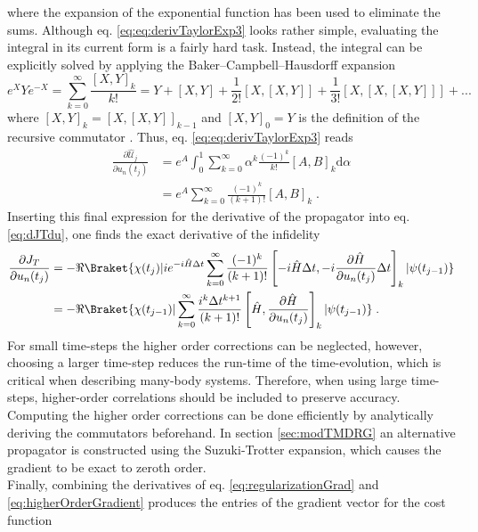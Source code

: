 where the expansion of the exponential function has been used to eliminate the sums. Although eq. \eqref{eq:eq:derivTaylorExp3} looks rather simple, evaluating the integral in its current form is a fairly hard task. Instead, the integral can be explicitly solved by applying the Baker–Campbell–Hausdorff expansion 
\begin{equation}
	e^X Y e^{-X} = \sum_{k = 0}^{\infty} \frac{ [ X,Y  ]_k }{k!} = Y + [ X,Y  ] + \frac{1}{2!} [ X , [ X,Y  ]] + \frac{1}{3!} [X, [ X , [ X,Y  ]]  ] + ...
\end{equation}
where $[ X , Y ]_k = [ X ,[ X , Y]]_{k-1}$ and $[X,Y]_0 = Y$ is the definition of the recursive commutator \cite{Wilcox1967}. Thus, eq. \eqref{eq:eq:derivTaylorExp3} reads
\begin{align}
	\frac{\partial \hat{\mathcal{U}}_{j}}{\partial u_n (t_j)} &=  e^A \int_{0}^{1} \sum_{k = 0}^{\infty } \alpha^{k} \frac{(-1)^k}{k!} [ A,B  ]_k \mathrm{d}\alpha \nonumber \\
	&= e^A  \sum_{k = 0}^{\infty }  \frac{(-1)^k}{(k+1)!} [ A,B  ]_k \; .
\end{align}
Inserting this final expression for the derivative of the propagator into eq. \eqref{eq:dJTdu}, one finds the exact derivative of the infidelity 
\begin{align}
\frac{\partial J_T}{\partial u_n (t_j)} &=  - \Re  \Braket{\chi (t_j) | i e^{-i \hat{H} \Delta t}  \sum_{k = 0}^{\infty }  \frac{(-1)^k}{(k+1)!} \left[ -i \hat{H} \Delta t , -i \frac{\partial \hat{H}}{\partial u_n (t_j)} \Delta t  \right]_k | \psi (t_{j-1})}  \nonumber \\
	&=  - \Re  \Braket{\chi (t_{j-1}) | \sum_{k = 0}^{\infty }  \frac{i^{k} \Delta t^{k+1}}{(k+1)!} \left[ \hat{H} , \frac{\partial \hat{H}}{\partial u_n (t_j)}  \right]_k | \psi (t_{j-1})}  \; . \label{eq:higherOrderGradient}
\end{align}
For small time-steps the higher order corrections can be neglected, however, choosing a larger time-step reduces the run-time of the time-evolution, which is critical when describing many-body systems. Therefore, when using large time-steps, higher-order correlations should be included to preserve accuracy. Computing the higher order corrections can be done efficiently by analytically deriving the commutators beforehand. In section \ref{sec:modTMDRG} an alternative propagator is constructed using the Suzuki-Trotter expansion, which causes the gradient to be exact to zeroth order.\\
Finally, combining the derivatives of eq. \eqref{eq:regularizationGrad} and \eqref{eq:higherOrderGradient} produces the entries of the gradient vector for the cost function
